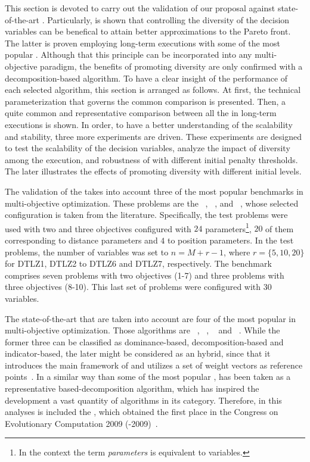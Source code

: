 This section is devoted to carry out the validation of our proposal against state-of-the-art \MOEAS{}.
%
Particularly, is shown that controlling the diversity of the decision variables can be benefical to attain better approximations to the Pareto front.
%
The latter is proven employing long-term executions with some of the most popular \MOEAS{}.
%
Although that this principle can be incorporated into any multi-objective paradigm, the benefits of promoting diversity are only confirmed with a decomposition-based algorithm.
%
To have a clear insight of the performance of each selected algorithm, this section is arranged as follows.
%
At first, the technical parameterization that governs the common comparison is presented.
%
Then, a quite common and representative comparison between all the \MOEAS{} in long-term executions is shown.
%
In order, to have a better understanding of the scalability and stability, three more experiments are driven.
%
These experiments are designed to test the scalability of the decision variables, analyze the impact of diversity among the execution, and robustness of \VSDMOEAD{} with different initial penalty thresholds.
%
The later illustrates the effects of promoting diversity with different initial levels.
%

The validation of the \MOEAS{} takes into account three of the most popular benchmarks in multi-objective optimization.
%
These problems are the \WFG{}~\cite{huband2006review}, \DTLZ{}~\cite{deb2005scalable}, and \UF{}~\cite{zhang2008multiobjective}, whose selected configuration is taken from the literature.
%
Specifically, the \WFG{} test problems were used with two and three objectives configured with $24$ parameters\footnote{In the \WFG{} context the term \textit{parameters} is equivalent to variables.}, $20$ of them corresponding to distance parameters and $4$ to position parameters.
%
In the \DTLZ{} test problems, the number of variables was set to $n=M+r-1$, where $r=\{5, 10, 20\}$ for DTLZ1, DTLZ2 to DTLZ6 and DTLZ7, respectively.
% 
The \UF{} benchmark comprises seven problems with two objectives (\UF{}1-7) and three problems with three objectives (\UF{}8-10).
%
This last set of problems were configured with $30$ variables.
%

The state-of-the-art \MOEAS{} that are taken into account are four of the most popular in multi-objective optimization.
%
Those algorithms are \NSGAII{}~\cite{deb2002fast}, \MOEADDE{}~\cite{zhang2009performance}, \RMOEA{}~\cite{trautmann2013r2} and \NSGAIII{}~\cite{deb2013evolutionary}.
%
While the former three can be classified as dominance-based, decomposition-based and indicator-based, the later might be considered as an hybrid, since that it introduces the main framework of \NSGAII{} and utilizes a set of weight vectors as reference points~\cite{trivedi2016survey}.
%
In a similar way than some of the most popular \MOEAS{}, \MOEAD{} has been taken as a representative based-decomposition algorithm, which has inspired the development a vast quantity of algorithms in its category.
%
Therefore, in this analyses is included the \MOEADDE{}, which obtained the first place in the Congress on Evolutionary Computation 2009 (\CEC{}-2009)~\cite{zhang2009performance}.
%

